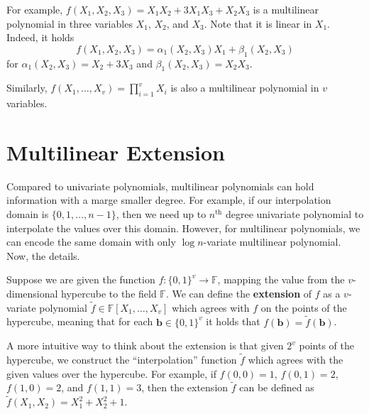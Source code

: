 \documentclass{gkr-template}
\begin{document}
\begin{example}
    For example, $f(X_1,X_2,X_3)=X_1X_2 + 3X_1X_3 + X_2X_3$ is a multilinear 
    polynomial in three variables $X_1$, $X_2$, and $X_3$. Note that it is linear 
    in $X_1$. Indeed, it holds
    \begin{equation*}
        f(X_1,X_2,X_3) = \alpha_1(X_2,X_3)X_1 + \beta_1(X_2,X_3)
    \end{equation*}
    for $\alpha_1(X_2,X_3) = X_2 + 3X_3$ and $\beta_1(X_2,X_3) = X_2X_3$.

    Similarly, $f(X_1,\dots,X_v)=\prod_{i=1}^v X_i$ is also a multilinear
    polynomial in $v$ variables.
\end{example}

\section*{Multilinear Extension}

Compared to univariate polynomials, multilinear polynomials can hold information
with a marge smaller degree. For example, if our interpolation domain is
$\{0,1,\dots,n-1\}$, then we need up to $n^{\text{th}}$ degree univariate
polynomial to interpolate the values over this domain. However, for multilinear
polynomials, we can encode the same domain with only $\log n$-variate
multilinear polynomial. Now, the details. 

\begin{definition}
    Suppose we are given the function $f: \{0,1\}^v \to \mathbb{F}$, mapping the
value from the $v$-dimensional hypercube to the field $\mathbb{F}$. We can
define the \textbf{extension} of $f$ as a $v$-variate polynomial $\widetilde{f}
\in \mathbb{F}[X_1,\dots,X_v]$ which agrees with $f$ on the points of the
hypercube, meaning that for each $\boldsymbol{b} \in \{0,1\}^v$ it holds that
$f(\boldsymbol{b}) = \widetilde{f}(\boldsymbol{b})$.
\end{definition}

\begin{example}
    A more intuitive way to think about the extension is that given $2^v$ points
    of the hypercube, we construct the ``interpolation'' function
    $\widetilde{f}$ which agrees with the given values over the hypercube. For
    example, if $f(0,0) = 1$, $f(0,1) = 2$, $f(1,0) = 2$, and $f(1,1) = 3$, then
    the extension $\widetilde{f}$ can be defined as
    $\widetilde{f}(X_1,X_2)=X_1^2+X_2^2+1$.
\end{example}
\end{document}
